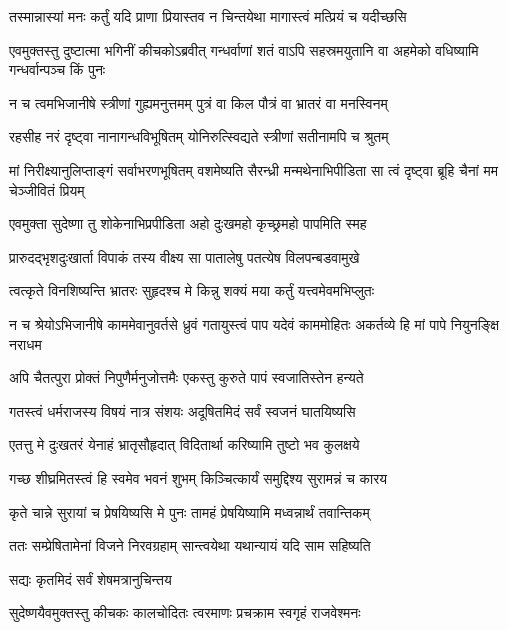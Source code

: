 \twolineshloka
{तस्मान्नास्यां मनः कर्तुं यदि प्राणा प्रियास्तव}
{न चिन्तयेथा मागास्त्वं मत्प्रियं च यदीच्छसि}



\threelineshloka
{एवमुक्तस्तु दुष्टात्मा भगिनीं कीचकोऽब्रवीत्}
{गन्धर्वाणां शतं वाऽपि सहस्रमयुतानि वा}
{अहमेको वधिष्यामि गन्धर्वान्पञ्च किं पुनः}


\twolineshloka
{न च त्वमभिजानीषे स्त्रीणां गुह्यमनुत्तमम्}
{पुत्रं वा किल पौत्रं वा भ्रातरं वा मनस्विनम्}


\twolineshloka
{रहसीह नरं दृष्ट्वा नानागन्धविभूषितम्}
{योनिरुत्स्विद्यते स्त्रीणां सतीनामपि च श्रुतम्}


\threelineshloka
{मां निरीक्ष्यानुलिप्ताङ्गं सर्वाभरणभूषितम्}
{वशमेष्यति सैरन्ध्री मन्मथेनाभिपीडिता}
{सा त्वं दृष्ट्वा ब्रूहि चैनां मम चेञ्जीवितं प्रियम्}



\twolineshloka
{एवमुक्ता सुदेष्णा तु शोकेनाभिप्रपीडिता}
{अहो दुःखमहो कृच्छ्रमहो पापमिति स्मह}


\twolineshloka
{प्रारुदद्भृशदुःखार्ता विपाकं तस्य वीक्ष्य सा}
{पातालेषु पतत्येष विलपन्बडवामुखे}


\twolineshloka
{त्वत्कृते विनशिष्यन्ति भ्रातरः सुहृदश्च मे}
{किन्नु शक्यं मया कर्तुं यत्त्वमेवमभिप्लुतः}


\threelineshloka
{न च श्रेयोऽभिजानीषे काममेवानुवर्तसे}
{ध्रुवं गतायुस्त्वं पाप यदेवं काममोहितः}
{अकर्तव्ये हि मां पापे नियुनङ्क्षि नराधम}


\twolineshloka
{अपि चैतत्पुरा प्रोक्तं निपुणैर्मनुजोत्तमैः}
{एकस्तु कुरुते पापं स्वजातिस्तेन हन्यते}


\twolineshloka
{गतस्त्वं धर्मराजस्य विषयं नात्र संशयः}
{अदूषितमिदं सर्वं स्वजनं घातयिष्यसि}


\twolineshloka
{एतत्तु मे दुःखतरं येनाहं भ्रातृसौहृदात्}
{विदितार्था करिष्यामि तुष्टो भव कुलक्षये}


\twolineshloka
{गच्छ शीघ्रमितस्त्वं हि स्वमेव भवनं शुभम्}
{किञ्चित्कार्यं समुद्दिश्य सुरामन्नं च कारय}


\twolineshloka
{कृते चान्ने सुरायां च प्रेषयिष्यसि मे पुनः}
{तामहं प्रेषयिष्यामि मध्वन्नार्थं तवान्तिकम्}


\twolineshloka
{ततः सम्प्रेषितामेनां विजने निरवग्रहाम्}
{सान्त्वयेथा यथान्यायं यदि साम सहिष्यति}


\onelineshloka
{सद्यः कृतमिदं सर्वं शेषमत्रानुचिन्तय}



\twolineshloka
{सुदेष्णयैवमुक्तस्तु कीचकः कालचोदितः}
{त्वरमाणः प्रचक्राम स्वगृहं राजवेश्मनः}


